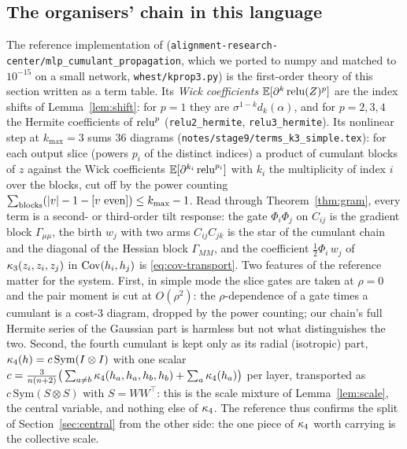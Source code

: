 \subsection{The organisers' chain in this language}
The reference implementation of \cite{Wu} (\texttt{alignment-research-center/mlp\_cumulant\_propagation}, which we
ported to numpy and matched to $10^{-15}$ on a small network, \texttt{whest/kprop3.py}) is the first-order theory
of this section written as a term table. Its \emph{Wick coefficients} $\mathbb E[\partial^k\operatorname{relu}(Z)^p]$ are the index
shifts of Lemma~\ref{lem:shift}: for $p=1$ they are $\sigma^{1-k}d_k(\alpha)$, and for $p=2,3,4$ the Hermite
coefficients of $\operatorname{relu}^p$ (\texttt{relu2\_hermite}, \texttt{relu3\_hermite}). Its nonlinear step at $k_{\max}=3$ sums
$36$ diagrams (\texttt{notes/stage9/terms\_k3\_simple.tex}): for each output slice (powers $p_i$ of the distinct
indices) a product of cumulant blocks of $z$ against the Wick coefficients $\mathbb E[\partial^{k_i}\operatorname{relu}^{p_i}]$ with
$k_i$ the multiplicity of index $i$ over the blocks, cut off by the power counting $\sum_{\rm blocks}(|v|-1-[v\
\text{even}])\le k_{\max}-1$. Read through Theorem~\ref{thm:gram}, every term is a second- or third-order tilt
response: the gate $\Phi_i\Phi_j$ on $C_{ij}$ is the gradient block $\Gamma_{\mu\mu}$, the birth $w_j$ with two
arms $C_{ij}C_{jk}$ is the star of the cumulant chain and the diagonal of the Hessian block $\Gamma_{MM}$, and the
coefficient $\tfrac12\Phi_i\,w_j$ of $\kappa_3(z_i,z_i,z_j)$ in $\operatorname{Cov}(h_i,h_j)$ is \eqref{eq:cov-transport}. Two
features of the reference matter for the system. First, in simple mode the slice gates are taken at
$\rho=0$ and the pair moment is cut at $O(\rho^2)$: the $\rho$-dependence of a gate times a cumulant is a cost-$3$
diagram, dropped by the power counting; our chain's full Hermite series of the Gaussian part is harmless but
not what distinguishes the two. Second, the fourth cumulant is kept only as its radial (isotropic) part,
$\kappa_4(h)=c\,\mathrm{Sym}(I\otimes I)$ with one scalar $c=\tfrac{3}{n(n+2)}\big(\sum_{a\ne b}\kappa_4(h_a,h_a,h_b,h_b)+
\sum_a\kappa_4(h_a)\big)$ per layer, transported as $c\,\mathrm{Sym}(S\otimes S)$ with $S=WW^\top$: this is the scale
mixture of Lemma~\ref{lem:scale}, the central variable, and nothing else of $\kappa_4$. The reference thus
confirms the split of Section~\ref{sec:central} from the other side: the one piece of $\kappa_4$ worth carrying is
the collective scale.
